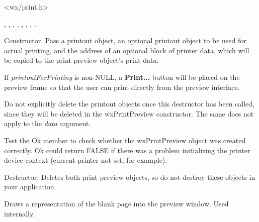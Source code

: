 


<wx/print.h>


, , ,\rtfsp
{}, ,\rtfsp
{}, ,\rtfsp
{}.




Constructor. Pass a printout object, an optional printout object to be
used for actual printing, and the address of an optional
block of printer data, which will be copied to the print preview object's
print data.

If {\it printoutForPrinting} is non-NULL, a {\bf Print...} button will be placed on the
preview frame so that the user can print directly from the preview interface.

Do not explicitly delete the printout objects once this destructor has been
called, since they will be deleted in the wxPrintPreview constructor.
The same does not apply to the {\it data} argument.

Test the Ok member to check whether the wxPrintPreview object was created correctly.
Ok could return FALSE if there was a problem initializing the printer device context
(current printer not set, for example).



Destructor. Deletes both print preview objects, so do not destroy these objects
in your application.

\label{wxprintpreviewdrawblankpage}


Draws a representation of the blank page into the preview window. Used
internally.

